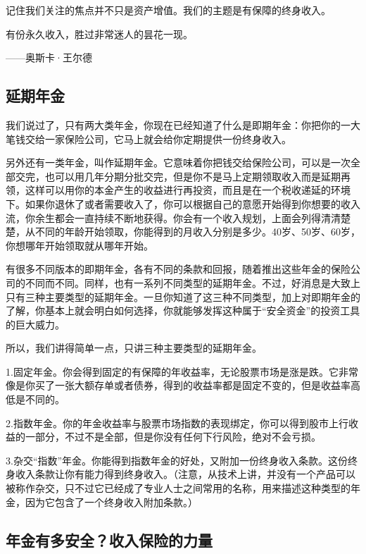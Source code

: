 记住我们关注的焦点并不只是资产增值。我们的主题是有保障的终身收入。

\begin{BookQuote}
有份永久收入，胜过非常迷人的昙花一现。

\hfill ——奥斯卡·王尔德
\end{BookQuote}

\subsection{延期年金}

我们说过了，只有两大类年金，你现在已经知道了什么是即期年金：你把你的一大笔钱交给一家保险公司，它马上就会给你定期提供一份终身收入。

另外还有一类年金，叫作延期年金。它意味着你把钱交给保险公司，可以是一次全部交完，也可以用几年分期分批交完，但是你不是马上定期领取收入而是延期再领，这样可以用你的本金产生的收益进行再投资，而且是在一个税收递延的环境下。如果你退休了或者需要收入了，你可以根据自己的意愿开始得到你想要的收入流，你余生都会一直持续不断地获得。你会有一个收入规划，上面会列得清清楚楚，从不同的年龄开始领取，你能得到的月收入分别是多少。40岁、50岁、60岁，你想哪年开始领取就从哪年开始。

有很多不同版本的即期年金，各有不同的条款和回报，随着推出这些年金的保险公司的不同而不同。同样，也有一系列不同类型的延期年金。不过，好消息是大致上只有三种主要类型的延期年金。一旦你知道了这三种不同类型，加上对即期年金的了解，你基本上就会明白如何选择，你就能够发挥这种属于“安全资金”的投资工具的巨大威力。

所以，我们讲得简单一点，只讲三种主要类型的延期年金。

1.固定年金。你会得到固定的有保障的年收益率，无论股票市场是涨是跌。它非常像是你买了一张大额存单或者债券，得到的收益率都是固定不变的，但是收益率高低是不同的。

2.指数年金。你的年金收益率与股票市场指数的表现绑定，你可以得到股市上行收益的一部分，不过不是全部，但是你没有任何下行风险，绝对不会亏损。

3.杂交“指数”年金。你能得到指数年金的好处，又附加一份终身收入条款。这份终身收入条款让你有能力得到终身收入。（注意，从技术上讲，并没有一个产品可以被称作杂交，只不过它已经成了专业人士之间常用的名称，用来描述这种类型的年金，因为它包含了一个终身收入附加条款。）

\subsection{年金有多安全？收入保险的力量}

